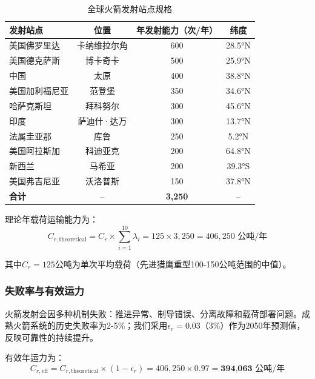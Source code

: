 \begin{table}[htbp]
    \centering
    \caption{全球火箭发射站点规格}
    \label{tab:launch_sites}
    \begin{tabular}{lccc}
        \toprule
        发射站点 & 位置 & 年发射能力（次/年） & 纬度 \\
        \midrule
        美国佛罗里达 & 卡纳维拉尔角 & 600 & 28.5°N \\
        美国德克萨斯 & 博卡奇卡 & 500 & 25.9°N \\
        中国 & 太原 & 400 & 38.8°N \\
        美国加利福尼亚 & 范登堡 & 350 & 34.6°N \\
        哈萨克斯坦 & 拜科努尔 & 300 & 45.6°N \\
        印度 & 萨迪什·达万 & 300 & 13.7°N \\
        法属圭亚那 & 库鲁 & 250 & 5.2°N \\
        美国阿拉斯加 & 科迪亚克 & 200 & 64.8°N \\
        新西兰 & 马希亚 & 200 & 39.3°S \\
        美国弗吉尼亚 & 沃洛普斯 & 150 & 37.8°N \\
        \midrule
        \textbf{合计} & -- & \textbf{3,250} & -- \\
        \bottomrule
    \end{tabular}
\end{table}

理论年载荷运输能力为：
\begin{equation}
    C_{r,\text{theoretical}} = C_r \times \sum_{i=1}^{10} \lambda_i = 125 \times 3,250 = 406,250 \text{ 公吨/年}
    \label{eq:rocket_theoretical}
\end{equation}

其中$C_r = 125$公吨为单次平均载荷（先进猎鹰重型100-150公吨范围的中值）。

\subsubsection{失败率与有效运力}

火箭发射会因多种机制失败：推进异常、制导错误、分离故障和载荷部署问题。成熟火箭系统的历史失败率为2-5\%；我们采用$\epsilon_r = 0.03$（3\%）作为2050年预测值，反映可靠性的持续提升。

有效年运力为：
\begin{equation}
    C_{r,\text{eff}} = C_{r,\text{theoretical}} \times (1 - \epsilon_r) = 406,250 \times 0.97 = \textbf{394,063 公吨/年}
    \label{eq:rocket_effective}
\end{equation}

